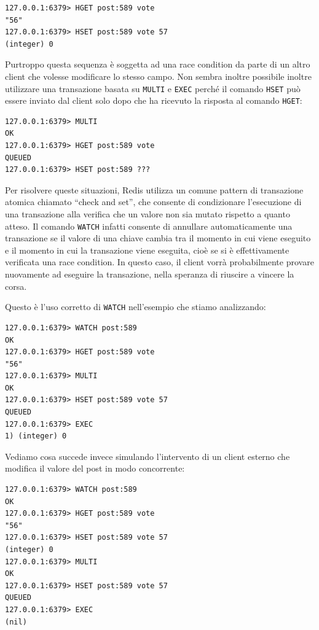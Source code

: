 \medskip
\begin{lstlisting}
127.0.0.1:6379> HGET post:589 vote
"56"
127.0.0.1:6379> HSET post:589 vote 57
(integer) 0
\end{lstlisting}

Purtroppo questa sequenza è soggetta ad una race condition da parte di un altro client che volesse
modificare lo stesso campo. Non sembra inoltre possibile inoltre utilizzare una transazione
basata su \verb|MULTI| e \verb|EXEC| perché il comando \verb|HSET| può essere inviato dal client
solo dopo che ha ricevuto la risposta al comando \verb|HGET|:

\medskip
\begin{lstlisting}
127.0.0.1:6379> MULTI
OK
127.0.0.1:6379> HGET post:589 vote
QUEUED
127.0.0.1:6379> HSET post:589 ???
\end{lstlisting}

Per risolvere queste situazioni, Redis utilizza un comune pattern di transazione atomica chiamato
``check and set'', che consente di condizionare l'esecuzione di una transazione alla verifica che un
valore non sia mutato rispetto a quanto atteso. Il comando \verb|WATCH| infatti consente di
annullare automaticamente una transazione se il valore di una chiave cambia tra il momento in cui
viene eseguito e il momento in cui la transazione viene eseguita, cioè se si è effettivamente
verificata una race condition. In questo caso, il client vorrà probabilmente provare nuovamente ad
eseguire la transazione, nella speranza di riuscire a vincere la corsa.

Questo è l'uso corretto di \verb|WATCH| nell'esempio che stiamo analizzando:

\medskip
\begin{lstlisting}
127.0.0.1:6379> WATCH post:589
OK
127.0.0.1:6379> HGET post:589 vote
"56"
127.0.0.1:6379> MULTI
OK
127.0.0.1:6379> HSET post:589 vote 57
QUEUED
127.0.0.1:6379> EXEC
1) (integer) 0
\end{lstlisting}

Vediamo cosa succede invece simulando l'intervento di un client esterno che modifica il valore
del post in modo concorrente:

\medskip
\begin{lstlisting}
127.0.0.1:6379> WATCH post:589
OK
127.0.0.1:6379> HGET post:589 vote
"56"
127.0.0.1:6379> HSET post:589 vote 57
(integer) 0
127.0.0.1:6379> MULTI
OK
127.0.0.1:6379> HSET post:589 vote 57
QUEUED
127.0.0.1:6379> EXEC
(nil)
\end{lstlisting}

